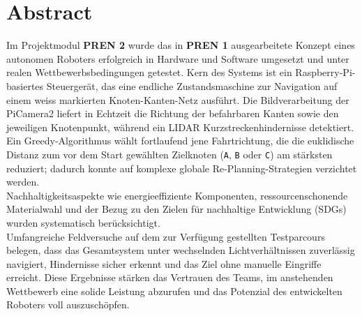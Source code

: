 \documentclass[main.tex]{subfiles} %
\begin{document}
\section*{Abstract}

Im Projektmodul \textbf{PREN 2} wurde das in \textbf{PREN 1} ausgearbeitete
Konzept eines autonomen Roboters erfolgreich in Hardware und Software
umgesetzt und unter realen Wettbewerbsbedingungen getestet.
Kern des Systems ist ein Raspberry-Pi-basiertes Steuergerät, das eine
endliche Zustandsmaschine zur Navigation auf einem weiss markierten
Knoten-Kanten-Netz ausführt. Die Bildverarbeitung der PiCamera2
liefert in Echtzeit die Richtung der befahrbaren Kanten sowie den
jeweiligen Knotenpunkt, während ein LIDAR Kurzstreckenhindernisse
detektiert. Ein Greedy-Algorithmus wählt fortlaufend jene Fahrtrichtung,
die die euklidische Distanz zum vor dem Start gewählten Zielknoten
(\texttt{A}, \texttt{B} oder \texttt{C}) am stärksten reduziert; dadurch
konnte auf komplexe globale Re-Planning-Strategien verzichtet werden.\\

Nachhaltigkeitsaspekte wie energieeffiziente Komponenten, ressourcenschonende
Materialwahl und der Bezug zu den Zielen für nachhaltige Entwicklung (SDGs) wurden
systematisch berücksichtigt.\\

Umfangreiche Feldversuche auf dem zur Verfügung gestellten Testparcours belegen,
dass das Gesamtsystem unter wechselnden Lichtverhältnissen zuverlässig
navigiert, Hindernisse sicher erkennt und das Ziel ohne manuelle Eingriffe
erreicht. Diese Ergebnisse stärken das Vertrauen des Teams, im anstehenden
Wettbewerb eine solide Leistung abzurufen und das Potenzial des entwickelten
Roboters voll auszuschöpfen.
\end{document}
